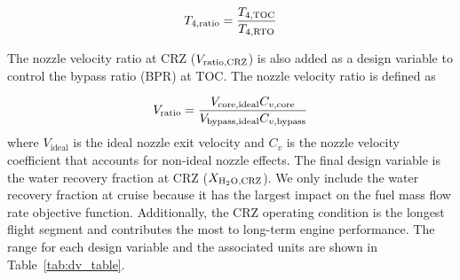 \documentclass[conf]{new-aiaa}
\begin{document}
\begin{equation}
  T_{4,\rm{ratio}} = \frac{T_{4,\rm{TOC}}}{T_{4,\rm{RTO}}}
  \label{t4ratio}
\end{equation}

\noindent
The nozzle velocity ratio at CRZ ($V_{\rm{ratio,CRZ}}$) is also added as a design variable to control the bypass ratio (BPR) at TOC.
The nozzle velocity ratio is defined as

\begin{equation}
  V_{\rm{ratio}} = \frac{V_{\rm{core,ideal}}C_{v,\rm{core}}}{V_{\rm{bypass,ideal}}C_{v,\rm{bypass}}}
  \label{eq:vratio}
\end{equation}
where $V_\text{ideal}$ is the ideal nozzle exit velocity and $C_v$ is the nozzle velocity coefficient that accounts for non-ideal nozzle effects.
The final design variable is the water recovery fraction at CRZ ($X_{\rm{H_2O,CRZ}}$).
We only include the water recovery fraction at cruise because it has the largest impact on the fuel mass flow rate objective function.
Additionally, the CRZ operating condition is the longest flight segment and contributes the most to long-term engine performance.
The range for each design variable and the associated units are shown in Table~\ref{tab:dv_table}.
\end{document}

